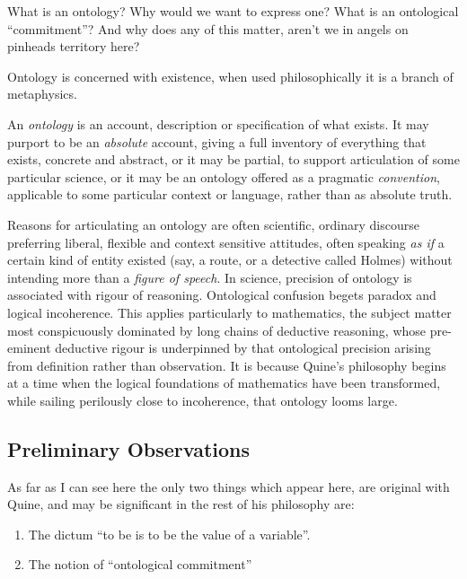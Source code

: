 \documentclass[10pt,titlepage]{article}
\begin{document}
What is an ontology? Why would we want to express one? What is an ontological ``commitment''?
And why does any of this matter, aren't we in angels on pinheads territory here?

Ontology is concerned with existence, when used philosophically it is a branch of metaphysics.

An \emph{ontology} is an account, description or specification of what exists.
It may purport to be an \emph{absolute} account, giving a full inventory of everything that exists, concrete and abstract, or it may be partial, to support articulation of some particular science, or it may be an ontology offered as a pragmatic {\it convention}, applicable to some particular context or language, rather than as absolute truth.

Reasons for articulating an ontology are often scientific, ordinary discourse preferring liberal, flexible and context sensitive attitudes, often speaking {\it as if} a certain kind of entity existed (say, a route, or a detective called Holmes) without intending more than a {\it figure of speech}.
In science, precision of ontology is associated with rigour of reasoning.
Ontological confusion begets paradox and logical incoherence.
This applies particularly to mathematics, the subject matter most conspicuously dominated by long chains of deductive reasoning, whose pre-eminent deductive rigour is underpinned by that ontological precision arising from definition rather than observation.
It is because Quine's philosophy begins at a time when the logical foundations of mathematics have been transformed, while sailing perilously close to incoherence, that ontology looms large.

\subsection{Preliminary Observations}
  
As far as I can see here the only two things which appear here, are original with Quine, and may be significant in the rest of his philosophy are:

\begin{enumerate}
\item The dictum ``to be is to be the value of a variable''.
\item The notion of ``ontological commitment'' 
\end{enumerate}
\end{document}
